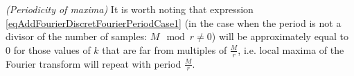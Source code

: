 \begin{remark}
\emph{(Periodicity of maxima)}
\label{rem:dsp:fourier:periodprop}
It is worth noting that expression 
\eqref{eqAddFourierDiscretFourierPeriodCase1} (in the case when
the period is not a divisor of the number of samples: $M \mod r \ne 0$) will be approximately
equal to 0 for those values of $k$ that are far from multiples of $\frac{M}{r}$, i.e. local maxima of the Fourier transform
will repeat with period $\frac{M}{r}$.
\end{remark}
